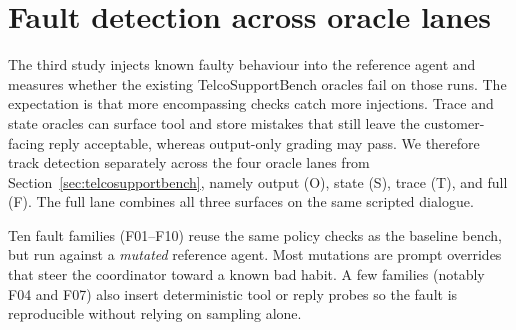 \section{Fault detection across oracle lanes}
\label{sec:fault-detection}

The third study injects known faulty behaviour into the reference agent and measures whether the existing TelcoSupportBench oracles fail on those runs. The expectation is that more encompassing checks catch more injections. Trace and state oracles can surface tool and store mistakes that still leave the customer-facing reply acceptable, whereas output-only grading may pass. We therefore track detection separately across the four oracle lanes from Section~\ref{sec:telcosupportbench}, namely output (O), state (S), trace (T), and full (F). The full lane combines all three surfaces on the same scripted dialogue.

Ten fault families (F01--F10) reuse the same policy checks as the baseline bench, but run against a \emph{mutated} reference agent. Most mutations are prompt overrides that steer the coordinator toward a known bad habit. A few families (notably F04 and F07) also insert deterministic tool or reply probes so the fault is reproducible without relying on sampling alone.

